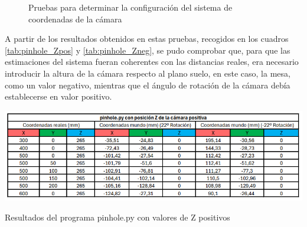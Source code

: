  \begin{figure}[H]
    \begin{center}
      \subcapcentertrue
      \hspace{2mm}
    \end{center}
    \caption{Pruebas para determinar la configuración del sistema de coordenadas de la cámara}
    \label{fig:prueba_ejes_camara}
  \end{figure}

\pagebreak  
A partir de los resultados obtenidos en estas pruebas, recogidos en los cuadros \ref{tab:pinhole_Zpos} y \ref{tab:pinhole_Zneg}, se pudo comprobar que, para que las estimaciones del sistema fueran coherentes con las distancias reales, era necesario introducir la altura de la cámara respecto al plano suelo, en este caso, la mesa, como un valor negativo, mientras que el ángulo de rotación de la cámara debía establecerse en valor positivo. %
  
  \begin{table}[H]
    \centering
    \begin{center}
      \includegraphics[width=150mm]{figs/pinhole con Z positiva.png}
    \end{center}
    \caption{Resultados del programa pinhole.py con valores de Z positivos}
    \label{tab:pinhole_Zpos}
  \end{table}
  
